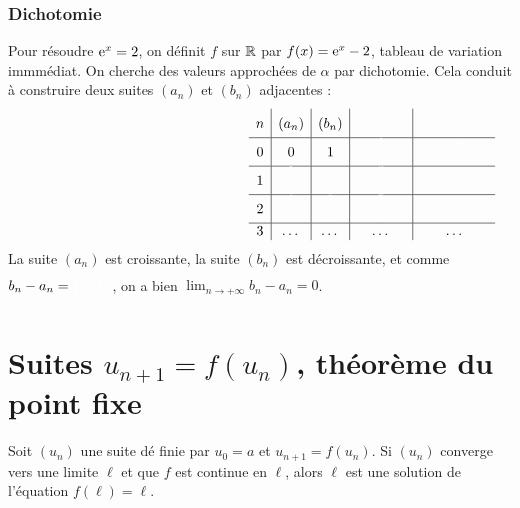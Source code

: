 \documentclass[a4paper,11pt,DIV14,BCOR0mm]{scrartcl}
\begin{document}
\subsubsection{Dichotomie}
Pour résoudre $\mathrm{e}^x=2$, on définit $f$ sur $\mathbb{R}$ par $f(x)=\mathrm{e}^x-2$, tableau de variation immmédiat. 
On cherche des valeurs approchées de $\alpha$ par dichotomie. Cela conduit à construire deux suites
$(a_n)$ et $(b_n)$ adjacentes :
\renewcommand{\arraystretch}{2}
\[\qquad\qquad\qquad\qquad\qquad\qquad\qquad\qquad
 \begin{array}{c|c|c|c|c}
  n	&	(a_n)	&	(b_n)	&	\trou{\dfrac{a_n+b_n}{2}}	&	\trou{f(\dfrac{a_n+b_n}{2})}\\\hline
  0	&	0	&	1	&	\trou{\dfrac{1}{2}}		&	\trou{-}\\\hline
  1	&\trou{\dfrac{1}{2}}	&	\trou{1}	&	\trou{\dfrac{3}{4}}		&	\trou{+}\\\hline
  2	&\trou{\dfrac{1}{2}}	&\trou{\dfrac{3}{4}}	&	\trou{\dfrac{5}{8}}		&	\trou{-}\\\hline
  3	&\dots		&\dots		&	\dots			&	\dots
 \end{array}
\]
La suite $(a_n)$ est croissante, la suite $(b_n)$ est décroissante, et comme $b_n-a_n=\trou{\left(\dfrac{1}{2}\right)^n}$,
on a bien $\displaystyle\lim_{n\to +\infty}b_n-a_n=0$.
\pagebreak

\section{Suites $u_{n+1}=f(u_n)$, théorème du point fixe}

\begin{theoreme}
 Soit $(u_n)$ une suite dé finie par $u_0=a$ et $u_{n+1}=f(u_n)$.
Si $(u_n)$ converge vers une limite $\ell$ et que $f$ est continue en $\ell$,
alors $\ell$ est une solution de l'équation $f(\ell)=\ell$.
\end{theoreme}
\end{document}
